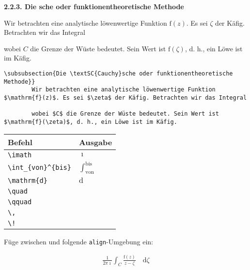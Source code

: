 \documentclass["WS\space 16-17\space -\space LaTeX-Kurs\space -\space Praesentation\space -\space 1.tex"]{subfiles}
\begin{document}
\begin{frame}[fragile]
	\Losung
	\begin{outputbox}
		{ \large\textbf{2.2.3. Die  sche oder funktionentheoretische Methode}}
		
		Wir betrachten eine analytische löwenwertige Funktion $\mathrm{f}(z)$. Es sei $\zeta$ der Käfig. Betrachten wir das Integral
		
	    wobei $C$ die Grenze der Wüste bedeutet. Sein Wert ist $\mathrm{f}(\zeta)$, d. h., ein Löwe ist im Käfig.
    \end{outputbox}

	\Code
	\begin{lstlisting}[gobble=4]
    \subsubsection{Die \textSC{Cauchy}sche oder funktionentheoretische Methode}}
		Wir betrachten eine analytische löwenwertige Funktion $\mathrm{f}(z)$. Es sei $\zeta$ der Käfig. Betrachten wir das Integral
		
		wobei $C$ die Grenze der Wüste bedeutet. Sein Wert ist $\mathrm{f}(\zeta)$, d. h., ein Löwe ist im Käfig.
	\end{lstlisting}
\end{frame}
\begin{frame}[fragile]
	\begin{center}
		\begin{tabular}{ll}
			\toprule
			Befehl							&	Ausgabe					\\ \midrule
			\lstinline|\imath|				&	$\imath$					\\
			\lstinline|\int_{von}^{bis}|		&	$\int_{\mathrm{von}}^{\mathrm{bis}}$		\\ \addlinespace[0.5em]
			\lstinline|\mathrm{d}|		&	$\mathrm{d}$		
		    \\ 			
		    \lstinline|\quad|		&	$\quad$		
	        \\ 
			\lstinline|\qquad|		&	$\qquad$		
			\\
			\lstinline|\,|					&	$\,$		\\
			\lstinline|\!|					&	$\!$		\\
			\bottomrule
		\end{tabular}
	\end{center}
	\pause\btVFill
	\Aufgabee
		Füge zwischen  und  folgende \lstinline[basicstyle=\normalfont\normalsize]|align|-Umgebung ein:
	\begin{outputbox}
	    \begin{align}
		    \frac{1}{2 \pi \imath} \int_C \frac{\mathrm{f}(z)}{z - \zeta} \quad \! \! \mathrm{d} \zeta
	    \end{align}	
	\end{outputbox}
	\vspace{0.2cm}
\end{frame}
\end{document}
